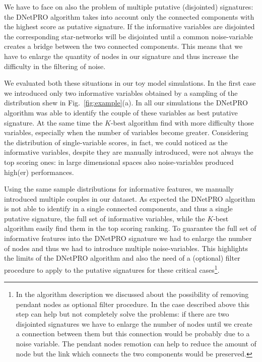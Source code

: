 \documentclass{standalone}
\begin{document}
We have to face on also the problem of multiple putative (disjointed) signatures: the DNetPRO algorithm takes into account only the connected components with the highest score as putative signature.
If the informative variables are disjointed the corresponding star-networks will be disjointed until a common noise-variable creates a bridge between the two connected components.
This means that we have to enlarge the quantity of nodes in our signature and thus increase the difficulty in the filtering of noise.

We evaluated both these situations in our toy model simulations.
In the first case we introduced only two informative variables obtained by a sampling of the distribution shew in Fig.~\ref{fig:example}(a).
In all our simulations the DNetPRO algorithm was able to identify the couple of these variables as best putative signature.
At the same time the $K$-best algorithm find with more difficulty those variables, especially when the number of variables become greater.
Considering the distribution of single-variable scores, in fact, we could noticed as the informative variables, despite they are manually introduced, were not always the top scoring ones: in large dimensional spaces also noise-variables produced high(er) performances.

Using the same sample distributions for informative features, we manually introduced multiple couples in our dataset.
As expected the DNetPRO algorithm is not able to identify in a single connected components, and thus a single putative signature, the full set of informative variables, while the $K$-best algorithm easily find them in the top scoring ranking.
To guarantee the full set of informative features into the DNetPRO signature we had to enlarge the number of nodes and thus we had to introduce multiple noise-variables.
This highlights the limits of the DNetPRO algorithm and also the need of a (optional) filter procedure to apply to the putative signatures for these critical cases\footnote{
  In the algorithm description we discussed about the possibility of removing pendant nodes as optional filter procedure.
  In the case described above this step can help but not completely solve the problems: if there are two disjointed signatures we have to enlarge the number of nodes until we create a connection between them but this connection would be probably due to a noise variable.
  The pendant nodes remotion can help to reduce the amount of node but the link which connects the two components would be preserved.
}.

\end{document}

